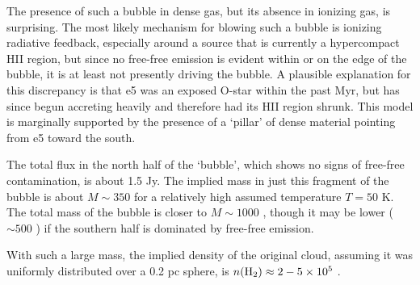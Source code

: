 \documentclass{aa}
\begin{document}
The presence of such a bubble in dense gas, but its absence in ionizing gas, is
surprising.  The most likely mechanism for blowing such a bubble is ionizing
radiative feedback, especially around a source that is currently a hypercompact
HII region, but since no free-free emission is evident within or on the edge of
the bubble, it is at least not presently driving the bubble.  A plausible
explanation for this discrepancy is that e5 was an exposed O-star within the
past Myr, but has since begun accreting heavily and therefore had its HII
region shrunk.  This model is marginally supported by the presence of a `pillar'
of dense material pointing from e5 toward the south.

The total flux in the north half of the `bubble', which shows no signs of
free-free contamination, is about 1.5 Jy.  The implied mass in just this
fragment of the bubble is about $M\sim350$ \msun for a relatively high assumed
temperature $T=50$ K.  The total mass of the bubble is closer to $M\sim1000$
\msun, though it may be lower ($\sim500$ \msun) if the southern half is
dominated by free-free emission.

With such a large mass, the implied density of the original cloud, assuming it
was uniformly distributed over a 0.2 pc sphere, is $n(\textrm{H}_{2}) \approx 2-5\times10^{5}$
\percc.
\end{document}
